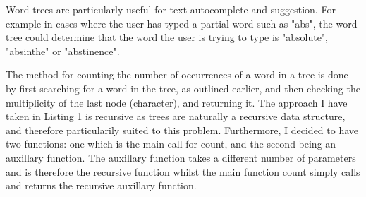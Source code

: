 \documentclass{article}
\begin{document}
  Word trees are particularly useful for text autocomplete and suggestion. For example in cases where the user has typed a partial word such as "abs", the word tree could determine that the word the user is trying to type is "absolute", "absinthe" or "abstinence".
  
    The method for counting the number of occurrences of a word in a tree is done by first searching for a word in the tree, as outlined earlier, and then checking the multiplicity of the last node (character), and returning it. The approach I have taken in Listing 1 is recursive as trees are naturally a recursive data structure, and therefore particularily suited to this problem. Furthermore, I decided to have two functions: one which is the main call for count, and the second being an auxillary function. The auxillary function takes a different number of parameters and is therefore the recursive function whilst the main function count simply calls and returns the recursive auxillary function. 
  
\end{document}

